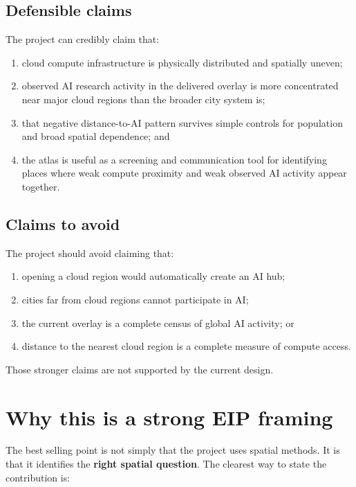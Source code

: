 \documentclass[11pt]{article}
\begin{document}
\subsection{Defensible claims}

The project can credibly claim that:

\begin{enumerate}[leftmargin=*]
  \item cloud compute infrastructure is physically distributed and spatially uneven;
  \item observed AI research activity in the delivered overlay is more concentrated near major cloud regions than the broader city system is;
  \item that negative distance-to-AI pattern survives simple controls for population and broad spatial dependence; and
  \item the atlas is useful as a screening and communication tool for identifying places where weak compute proximity and weak observed AI activity appear together.
\end{enumerate}

\subsection{Claims to avoid}

The project should avoid claiming that:

\begin{enumerate}[leftmargin=*]
  \item opening a cloud region would automatically create an AI hub;
  \item cities far from cloud regions cannot participate in AI;
  \item the current overlay is a complete census of global AI activity; or
  \item distance to the nearest cloud region is a complete measure of compute access.
\end{enumerate}

Those stronger claims are not supported by the current design.

\section{Why this is a strong EIP framing}

The best selling point is not simply that the project uses spatial methods. It is that it identifies the \textbf{right spatial question}. The clearest way to state the contribution is:
\end{document}
